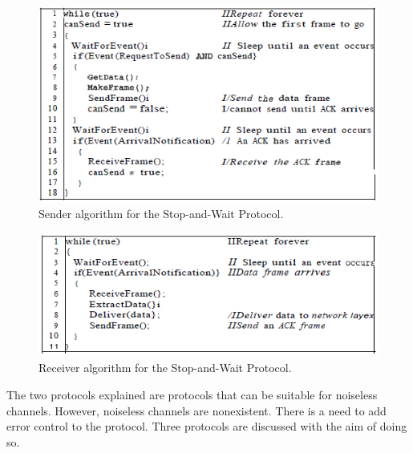 \begin{figure}[H]
\begin{center}
\includegraphics[scale=1]{sendersawp.PNG} 
\caption{Sender algorithm for the Stop-and-Wait Protocol.}
\end{center}
\end{figure}

\begin{figure}[H]
\begin{center}
\includegraphics[scale=1]{receiversawp.PNG} 
\caption{Receiver algorithm for the Stop-and-Wait Protocol.}
\end{center}
\end{figure}

The two protocols explained are protocols that can be suitable for noiseless channels. However, noiseless channels are nonexistent. There is a need to add error control to the protocol. Three protocols are discussed with the aim of doing so.

